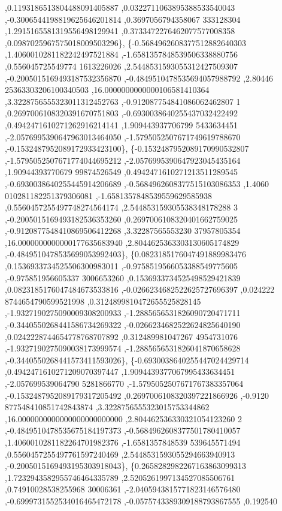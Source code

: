\begin{DoxyCode}
       ,0.1193186513804488091405887 ,0.0322711063895388533540043 ,-0.3006544198819625646201814 ,0.3697056794358067
      333128304 ,1.2915165581319556498129941 ,0.3733472276462077577008358 ,0.0987025967575018009503296\},
\{-0.5684962608377512882640303 ,1.4060010281182242497521884 ,-1.6581357848539506338880756 ,0.556045725549774
      1613226026 ,2.5448531593055312427509307 ,-0.2005015169493187532356870 ,-0.4849510478535694057988792 ,2.80446
      25363303206100340503 ,16.0000000000000106581410364 ,3.3228756555323011312452763 ,-0.912087754841086062462807
      1 ,0.2697006108320391670751803 ,-0.6930038640255437032422492 ,0.4942471610271262916214141 ,1.909443937706799
      5433634451 ,-2.0576995390647963013464050 ,-1.5795052507671749619788670 ,-0.1532487952089172933423100\},
\{-0.1532487952089170990532807 ,-1.5795052507671774044695212 ,-2.0576995390647923045435164 ,1.90944393770679
      99874526549 ,0.4942471610271213511289545 ,-0.6930038640255445914206689 ,-0.5684962608377515103086353 ,1.4060
      010281182251379306081 ,-1.6581357848539559629585938 ,0.5560457255497748274564174 ,2.544853159305538348178288
      3 ,-0.2005015169493182536353260 ,0.2697006108320401662759025 ,-0.9120877548410869506412268 ,3.32287565553230
      37957805354 ,16.0000000000000177635683940 ,2.8044625363303130605174829 ,-0.4849510478535699053992403\},
\{0.0823185176047491889983476 ,0.1536933734525506300983011 ,-0.9758519566053388549775605 ,-0.975851956605337
      3006653260 ,0.1536933734525498529421839 ,0.0823185176047484673533816 ,-0.0266234682522625727696397 ,0.024222
      8744654790599521998 ,0.3124899810472655525828145 ,-1.9327190275090009308200933 ,-1.2885656531826090720471711
       ,-0.3440550268441586734269322 ,-0.0266234682522624825640190 ,0.0242228744654778768707892 ,0.312489981047267
      4954731076 ,-1.9327190275090038173999574 ,-1.2885656531826041870658628 ,-0.3440550268441573411593026\},
\{-0.6930038640255447024429714 ,0.4942471610271209070397447 ,1.9094439377067995433634451 ,-2.057699539064790
      5281866770 ,-1.5795052507671767383357064 ,-0.1532487952089179317205492 ,0.2697006108320397221866926 ,-0.9120
      877548410851742843874 ,3.3228756555323015753344862 ,16.0000000000000000000000000 ,2.804462536330321054123260
      2 ,-0.4849510478535675184197373 ,-0.5684962608377501780410057 ,1.4060010281182264701982376 ,-1.6581357848539
      539645571494 ,0.5560457255497761597240469 ,2.5448531593055294663940913 ,-0.2005015169493195303918043\},
\{0.2658282982267163863099313 ,1.7232943582955746464335789 ,2.5205261997134527085506761 ,0.74910028538255968
      30006361 ,-2.0405943815771823146576480 ,-0.6999731552534016465472178 ,-0.0575743389309188793867555 ,0.192540

\end{DoxyCode}
